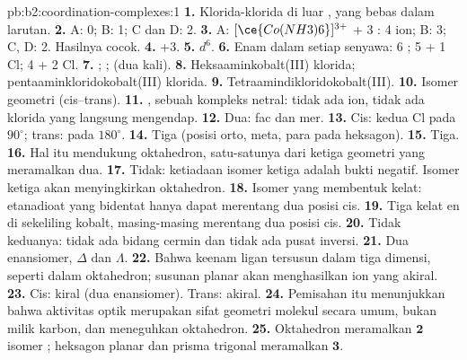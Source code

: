 \begin{solution}{pb:b2:coordination-complexes:1}
\textbf{1.} Klorida-klorida di luar , yang bebas dalam larutan.
\textbf{2.} A: 0; B: 1; C dan D: 2.
\textbf{3.} A: $[\ce{Co(NH3)6}]^{3+}$ + 3 : 4 ion; B: 3; C, D: 2. Hasilnya cocok.
\textbf{4.} +3.
\textbf{5.} $d^6$.
\textbf{6.} Enam dalam setiap senyawa: 6 ; 5  + 1 Cl; 4  + 2 Cl.
\textbf{7.} ; ;  (dua kali).
\textbf{8.} Heksaaminkobalt(III) klorida; pentaaminkloridokobalt(III) klorida.
\textbf{9.} Tetraamindikloridokobalt(III).
\textbf{10.} Isomer geometri (cis--trans).
\textbf{11.} \ce{[CoCl3(NH3)3]}, sebuah kompleks netral: tidak ada ion, tidak
ada klorida yang langsung mengendap.
\textbf{12.} Dua: fac dan mer.
\textbf{13.} Cis: kedua Cl pada $90^\circ$; trans: pada $180^\circ$.
\textbf{14.} Tiga (posisi orto, meta, para pada heksagon).
\textbf{15.} Tiga.
\textbf{16.} Hal itu mendukung oktahedron, satu-satunya dari ketiga geometri
yang meramalkan dua.
\textbf{17.} Tidak: ketiadaan isomer ketiga adalah bukti negatif. Isomer
ketiga akan menyingkirkan oktahedron.
\textbf{18.} Isomer yang membentuk kelat: etanadioat yang bidentat hanya
dapat merentang dua posisi cis.
\textbf{19.} Tiga kelat en di sekeliling kobalt, masing-masing merentang dua
posisi cis.
\textbf{20.} Tidak keduanya: tidak ada bidang cermin dan tidak ada pusat inversi.
\textbf{21.} Dua enansiomer, $\Delta$ dan $\Lambda$.
\textbf{22.} Bahwa keenam ligan tersusun dalam tiga dimensi, seperti dalam
oktahedron; susunan planar akan menghasilkan ion yang akiral.
\textbf{23.} Cis: kiral (dua enansiomer). Trans: akiral.
\textbf{24.} Pemisahan itu menunjukkan bahwa aktivitas optik merupakan sifat
geometri molekul secara umum, bukan milik karbon, dan meneguhkan oktahedron.
\textbf{25.} Oktahedron meramalkan $\boldsymbol{2}$ isomer \ce{[CoCl2(NH3)4]+};
heksagon planar dan prisma trigonal meramalkan $\boldsymbol{3}$.
\end{solution}
